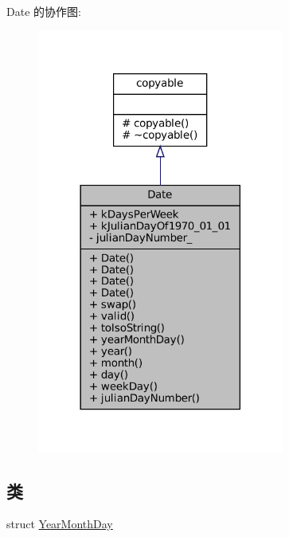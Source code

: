 Date 的协作图\+:
\nopagebreak
\begin{figure}[H]
\begin{center}
\leavevmode
\includegraphics[width=230pt]{classmuduo_1_1Date__coll__graph}
\end{center}
\end{figure}
\subsection*{类}
\begin{DoxyCompactItemize}
\item 
struct \hyperlink{structmuduo_1_1Date_1_1YearMonthDay}{Year\+Month\+Day}
\end{DoxyCompactItemize}
